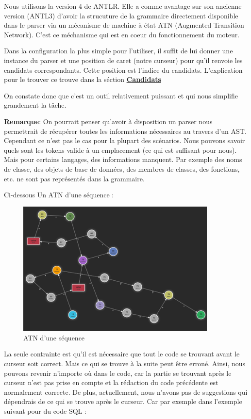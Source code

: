 \documentclass[
    iict, %
    il, %
]{heig-tb}
\begin{document}
Nous utilisons la version 4 de ANTLR. Elle a comme avantage sur son ancienne version (ANTL3) d'avoir la strucuture de la grammaire directement disponible dans le parser via
un mécanisme de machine à état ATN (Augmented Transition Network). C'est ce méchanisme qui est en coeur du fonctionnement du moteur.

Dans la configuration la plus simple pour l'utiliser, il suffit de lui donner une instance du parser et une position de caret (notre curseur) pour qu'il renvoie les candidats correspondants.
Cette position est l'indice du candidats. L'explication pour le trouver ce trouve dans la séction \hyperref[candidates]{\textbf{Candidats}}

On constate donc que c'est un outil relativement puissant et qui nous simplifie grandement la tâche.

\textbf{Remarque}: On pourrait penser qu'avoir à disposition un parser nous permettrait de récupérer toutes les informations nécessaires au travers d'un AST. Cependant ce n'est pas le cas pour la plupart des scénarios.
Nous pouvons savoir quels sont les tokens valide à un emplacement (ce qui est suffisant pour nous). Mais pour certains langages, des informations manquent. Par exemple des noms de classe, des objets de base de données, des membres de classes, des fonctions, etc. ne sont pas représentés dans la grammaire. 

Ci-dessous Un ATN d'une séquence :

\begin{figure}[!ht]
    \begin{center}
        \includegraphics[width=10cm]{assets/figures/seq_ATN.png}
    \end{center}
    \caption[ATN d'une séquence]{\label{seq_ATN} ATN d'une séquence}
\end{figure}

La seule contrainte est qu'il est nécessaire que tout le code se trouvant avant le curseur soit correct. Mais ce qui se trouve à la suite peut être erroné.
Ainsi, nous pouvons revenir n'importe où dans le code, car la partie se trouvant après le curseur n'est pas prise en compte et la rédaction du code précédente est normalement correcte.
De plus, actuellement, nous n'avons pas de suggestions qui dépendrais de ce qui se trouve après le curseur.
Car par exemple dans l'exemple suivant pour du code SQL :
\end{document}
